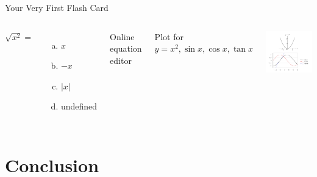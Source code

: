 \documentclass{beamer}
\begin{document}
\begin{frame}[t]{Your Very First Flash Card}\vspace{10pt}
  \begin{columns}
    $\sqrt{x^2}=$\\[0pt]
    \begin{enumerate}[(a)]
      \item $x$
      \item $-x$
      \item $|x|$
      \item undefined
    \end{enumerate}  \vspace{40pt}
    \tiny{Online equation editor} 
    \href{https://latex.codecogs.com/legacy/eqneditor/editor.php}{}  
    \\[15pt]
    \begin{center}
      Plot for \\
      $ y = x^2, \sin x, \cos x, \tan x$
    \end{center}
    \includegraphics[scale=0.16]{../../img/graph.png}
  \end{columns}  
\end{frame}

\section{Conclusion}
\end{document}

